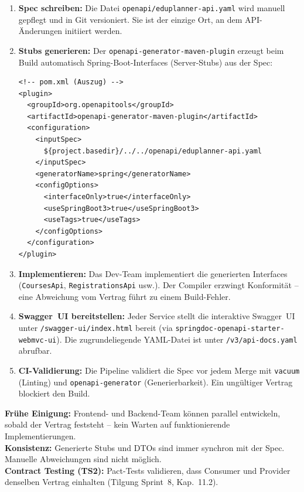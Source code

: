 \begin{enumerate}[leftmargin=2em]
  \item \textbf{Spec schreiben:} Die Datei
  \texttt{openapi/}\allowbreak \texttt{eduplanner-}\allowbreak \texttt{api.yaml} wird manuell gepflegt und
  in Git versioniert. Sie ist der einzige Ort, an dem API-Änderungen
  initiiert werden.
  \item \textbf{Stubs generieren:} Der \texttt{openapi-}\allowbreak \texttt{generator-}\allowbreak \texttt{maven-}\allowbreak \texttt{plugin}
  erzeugt beim Build automatisch Spring-Boot-Interfaces (Server-Stubs)
  aus der Spec:
\begin{lstlisting}
<!-- pom.xml (Auszug) -->
<plugin>
  <groupId>org.openapitools</groupId>
  <artifactId>openapi-generator-maven-plugin</artifactId>
  <configuration>
    <inputSpec>
      ${project.basedir}/../../openapi/eduplanner-api.yaml
    </inputSpec>
    <generatorName>spring</generatorName>
    <configOptions>
      <interfaceOnly>true</interfaceOnly>
      <useSpringBoot3>true</useSpringBoot3>
      <useTags>true</useTags>
    </configOptions>
  </configuration>
</plugin>
\end{lstlisting}
  \item \textbf{Implementieren:} Das Dev-Team implementiert die
  generierten Interfaces (\texttt{CoursesApi}, \texttt{RegistrationsApi}
  usw.). Der Compiler erzwingt Konformität -- eine Abweichung vom
  Vertrag führt zu einem Build-Fehler.
  \item \textbf{Swagger~UI bereitstellen:} Jeder Service stellt die
  interaktive Swagger~UI unter
  \texttt{/swagger-ui/index.html} bereit (via
  \texttt{springdoc-}\allowbreak \texttt{openapi-}\allowbreak \texttt{starter-}\allowbreak \texttt{webmvc-}\allowbreak \texttt{ui}).
  Die zugrundeliegende YAML-Datei ist unter
  \texttt{/v3/api-docs.yaml} abrufbar.
  \item \textbf{CI-Validierung:} Die Pipeline validiert die Spec vor
  jedem Merge mit \texttt{vacuum} (Linting) und
  \texttt{openapi-generator} (Generierbarkeit). Ein ungültiger
  Vertrag blockiert den Build.
\end{enumerate}

\begin{reviewbox}
  \textbf{Frühe Einigung:} Frontend- und Backend-Team können parallel
  entwickeln, sobald der Vertrag feststeht -- kein Warten auf
  funktionierende Implementierungen.\\[4pt]
  \textbf{Konsistenz:} Generierte Stubs und DTOs sind immer synchron
  mit der Spec. Manuelle Abweichungen sind nicht möglich.\\[4pt]
  \textbf{Contract Testing (TS2):} Pact-Tests validieren, dass
  Consumer und Provider denselben Vertrag einhalten
  (Tilgung Sprint~8, Kap.~11.2).
\end{reviewbox}

